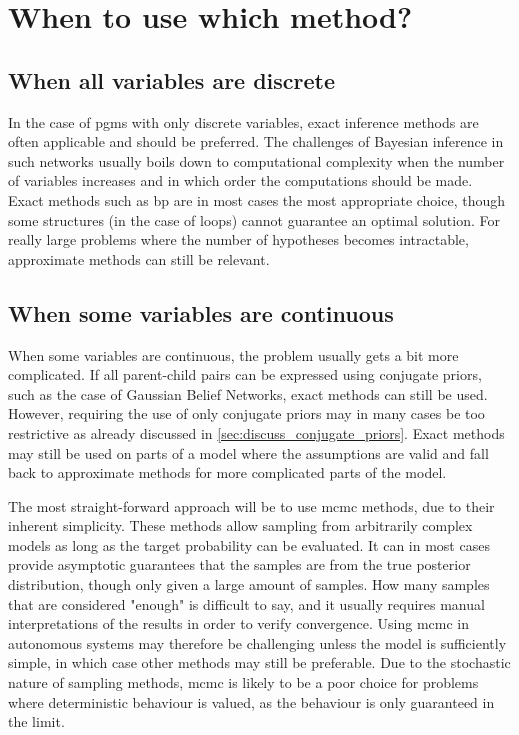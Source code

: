 \section{When to use which method?}

\subsection{When all variables are discrete}
In the case of \acrshort{pgm}s with only discrete variables, exact inference methods are often applicable and should be preferred. The challenges of Bayesian inference in such networks usually boils down to computational complexity when the number of variables increases and in which order the computations should be made. Exact methods such as \acrshort{bp} are in most cases the most appropriate choice, though some structures (in the case of loops) cannot guarantee an optimal solution. For really large problems where the number of hypotheses becomes intractable, approximate methods can still be relevant. 

\subsection{When some variables are continuous}
When some variables are continuous, the problem usually gets a bit more complicated. If all parent-child pairs can be expressed using conjugate priors, such as the case of Gaussian Belief Networks, exact methods can still be used. However, requiring the use of only conjugate priors may in many cases be too restrictive as already discussed in \cref{sec:discuss_conjugate_priors}. Exact methods may still be used on parts of a model where the assumptions are valid and fall back to approximate methods for more complicated parts of the model.

The most straight-forward approach will be to use \acrshort{mcmc} methods, due to their inherent simplicity. These methods allow sampling from arbitrarily complex models as long as the target probability can be evaluated. It can in most cases provide asymptotic guarantees that the samples are from the true posterior distribution, though only given a large amount of samples. How many samples that are considered "enough" is difficult to say, and it usually requires manual interpretations of the results in order to verify convergence. Using \acrshort{mcmc} in autonomous systems may therefore be challenging unless the model is sufficiently simple, in which case other methods may still be preferable. Due to the stochastic nature of sampling methods, \acrshort{mcmc} is likely to be a poor choice for problems where deterministic behaviour is valued, as the behaviour is only guaranteed in the limit.  


